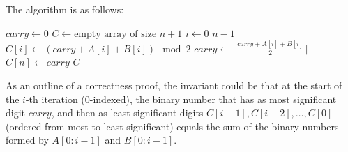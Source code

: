 \begin{solution}
    
    The algorithm is as follows:

    \begin{codebox}
        \li $carry \gets 0$
        \li $C \gets \text{empty array of size } n + 1$
        \li \For $i \gets 0$ \To $n - 1$
        \li \Do $C[i] \gets (carry + A[i] + B[i]) \mod 2$
        \li $carry \gets \lceil \frac{carry + A[i] + B[i]}{2} \rceil$
        \End
        \li $C[n] \gets carry$
        \li \Return $C$
    \end{codebox}    

    As an outline of a correctness proof, the invariant could be that at the start of the $i$-th iteration (0-indexed), the binary number that has as most significant digit $carry$, and then as least significant digits $C[i - 1], C[i - 2], \ldots, C[0]$ (ordered from most to least significant) equals the sum of the binary numbers formed by $A[0:i - 1]$ and $B[0:i - 1]$.

\end{solution}